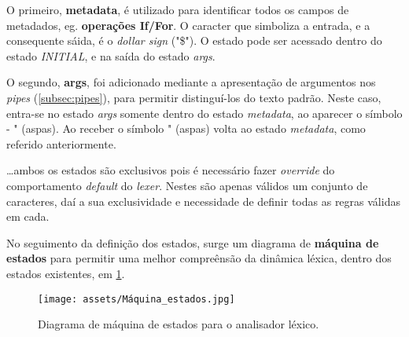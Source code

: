 \documentclass[../relatorio.tex]{subfiles}
\begin{document}
    \inputminted[firstline=13, lastline=16]{py}{../pandoc_lex.py}

    O primeiro, \textbf{metadata}, é utilizado para identificar todos os
    campos de metadados, eg. \textbf{operações If/For}.
    O caracter que simboliza a entrada, e a consequente sáida, é o 
    \textit{dollar sign} ("\$").
    O estado pode ser acessado dentro do estado \textit{INITIAL}, e
    na saída do estado \textit{args}.

    O segundo, \textbf{args}, foi adicionado mediante a apresentação 
    de argumentos nos \textit{pipes} (\ref{subsec:pipes}), para permitir 
    distinguí-los do texto padrão. 
    Neste caso, entra-se no estado \textit{args} somente dentro do 
    estado \textit{metadata}, ao aparecer o símbolo - " (aspas).
    Ao receber o símbolo " (aspas) volta ao estado \textit{metadata},
    como referido anteriormente.

    \dots ambos os estados são exclusivos pois é necessário fazer \textit{override}
    do comportamento \textit{default} do \textit{lexer}.
    Nestes são apenas válidos um conjunto de caracteres, daí a sua exclusividade e 
    necessidade de definir todas as regras válidas em cada.

    No seguimento da definição dos estados, surge um diagrama de 
    \textbf{máquina de estados} para permitir uma melhor compreênsão da
    dinâmica léxica, dentro dos estados existentes, em \ref{fig:state_machine}.

    \begin{figure}[!ht]
        \centering
        \texttt{[image: assets/Máquina\_estados.jpg]}
        \caption{Diagrama de máquina de estados para o analisador léxico.}
        \label{fig:state_machine}
    \end{figure}
\end{document}
